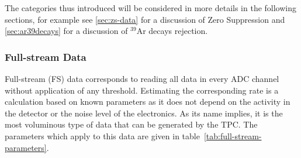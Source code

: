 The categories thus introduced will be considered in more details in the following sections, for example
see \ref{sec:zs-data} for a discussion of Zero Suppression and \ref{sec:ar39decays} for a discussion of
$^{39}$Ar decays rejection.


\subsubsection{Full-stream Data}

Full-stream (FS) data corresponds to reading all data in every ADC channel without
application of any threshold. Estimating the corresponding rate is a calculation based on
known parameters as it does not depend on the activity in the detector or the noise
level of the electronics. As its name implies, it is the most voluminous type of data
that can be generated by the TPC. The parameters which apply to this data are given in
table~\ref{tab:full-stream-parameters}.

